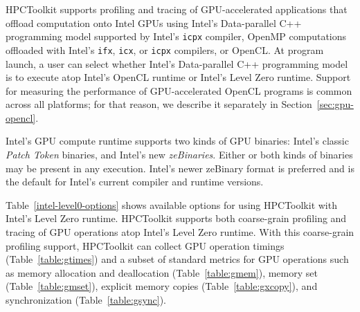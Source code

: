 
HPCToolkit supports profiling and tracing of GPU-accelerated  applications that offload computation onto Intel GPUs using  Intel's Data-parallel C++ programming model supported by Intel's {\tt icpx} compiler, OpenMP computations offloaded with Intel's {\tt ifx}, {\tt icx}, or {\tt icpx} compilers, or OpenCL. At program launch, a user can select whether Intel's Data-parallel C++ programming model is to execute atop Intel's OpenCL runtime or Intel's Level Zero runtime. Support for measuring the performance of GPU-accelerated OpenCL programs is common across all platforms; for that reason, we describe it separately in Section~\ref{sec:gpu-opencl}.

Intel's GPU compute runtime supports two kinds of GPU binaries: Intel's classic {\em Patch Token} binaries, and Intel's new {\em zeBinaries}. Either or both kinds of binaries may be present in any execution. Intel's newer zeBinary format is preferred and is the default for Intel's current compiler and runtime versions.

Table~\ref{intel-level0-options} shows available options for using HPCToolkit with Intel's Level Zero runtime. HPCToolkit supports both coarse-grain profiling and tracing of GPU operations atop Intel's Level Zero runtime. With this coarse-grain profiling support, HPCToolkit can collect GPU operation timings (Table~\ref{table:gtimes}) and a subset of standard metrics for GPU operations such as memory allocation and deallocation (Table~\ref{table:gmem}), memory set (Table~\ref{table:gmset}), explicit memory copies (Table~\ref{table:gxcopy}), and synchronization (Table~\ref{table:gsync}). 


